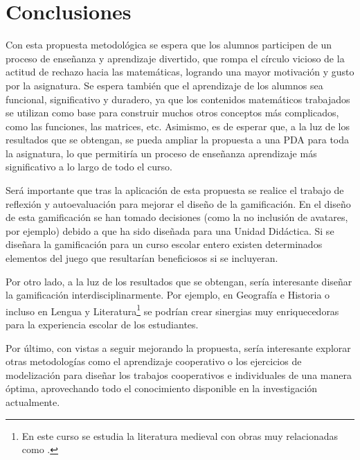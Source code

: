 
\chapter{Conclusiones}
\label{chap:conclusiones}

Con esta propuesta metodológica se espera que los alumnos participen de un proceso de enseñanza y aprendizaje divertido, que rompa el círculo vicioso de la actitud de rechazo hacia las matemáticas, logrando una mayor motivación y gusto por la asignatura.
%
Se espera también que el aprendizaje de los alumnos sea funcional, significativo y duradero, ya que los contenidos matemáticos trabajados se utilizan como base para construir muchos otros conceptos más complicados, como las funciones, las matrices, etc.
Asimismo, es de esperar que, a la luz de los resultados que se obtengan, se pueda ampliar la propuesta a una \gls{PDA} para toda la asignatura, lo que permitiría un proceso de enseñanza aprendizaje más significativo a lo largo de todo el curso.

Será importante que tras la aplicación de esta propuesta se realice el trabajo de reflexión y autoevaluación para mejorar el diseño de la gamificación.
%
En el diseño de esta gamificación se han tomado decisiones (como la no inclusión de avatares, por ejemplo) debido a que ha sido diseñada para una Unidad Didáctica.
%
Si se diseñara la gamificación para un curso escolar entero existen determinados elementos del juego que resultarían beneficiosos si se incluyeran.


Por otro lado, a la luz de los resultados que se obtengan, sería interesante diseñar la gamificación interdisciplinarmente.
%
Por ejemplo, en Geografía e Historia o incluso en Lengua y Literatura\footnote{En este curso se estudia la literatura medieval con obras muy relacionadas como .} se podrían crear sinergias muy enriquecedoras para la experiencia escolar de los estudiantes.

Por último, con vistas a seguir mejorando la propuesta, sería interesante explorar otras metodologías como el aprendizaje cooperativo o los ejercicios de modelización para diseñar los trabajos cooperativos e individuales de una manera óptima, aprovechando todo el conocimiento disponible en la investigación actualmente.

